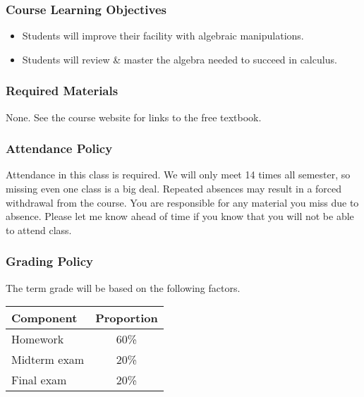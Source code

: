 \documentclass[10pt]{article}
\begin{document}
\subsubsection*{Course Learning Objectives}

\begin{itemize}

\item Students will improve their facility with algebraic manipulations.
\item Students will review \& master the algebra needed to succeed in calculus.

\end{itemize}

\subsubsection*{Required Materials}

None. See the course website for links to the free textbook.

%
\subsubsection*{Attendance Policy}

Attendance in this class is required. We will only meet 14 times all semester, so missing even one class is a big deal. Repeated absences may result in a forced withdrawal from the course. You are responsible for any material you miss due to absence. Please let me know ahead of time if you know that you will not be able to attend class.

\subsubsection*{Grading Policy}

The term grade will be based on the following factors.

\begin{center}
\begin{tabular}{|l|c|}
\hline
Component      & Proportion \\ \hline
Homework & 60\% \\
Midterm exam  & 20\% \\
Final exam  & 20\% \\ \hline
\end{tabular}
\end{center}
\end{document}
